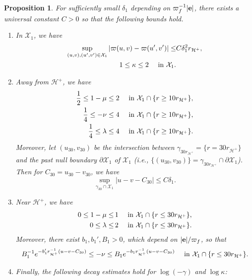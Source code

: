 \documentclass[10pt, reqno]{amsart}
\newtheorem{proposition}[theorem]{Proposition}
\theoremstyle{definition}
\theoremstyle{remark}
\theoremstyle{conjecture}
\numberwithin{equation}{section}
\newcommand{\abs}[1]{\vert#1\vert}
\newcommand{\set}[1]{\{#1\}}
\newcommand{\rd}{\partial}
\newcommand{\0}{\emptyset}
\newcommand{\gmm}{\gamma}
\newcommand{\dlt}{\delta}
\newcommand{\kpp}{\kappa}
\newcommand{\lmb}{\lambda}
\newcommand{\bfe}{{\bf e}}
\newcommand{\calH}{\mathcal H}
\newcommand{\calX}{\mathcal X}
\newcommand{\dur}{\nu}
\newcommand{\dvr}{\lmb}
\newcommand{\EH}{\calH^{+}}
\newcommand{\e}{\bfe}							%
\begin{document}
\begin{proposition}
For sufficiently small $\dlt_{1}$ depending on $\varpi_{f}^{-1} \abs{\e}$, there exists a universal constant $C > 0$ so that the following bounds hold.
\begin{enumerate}
\item In $\calX_{1}$, we have
\begin{align} 
	\sup_{(u, v), (u', v') \in \calX_{1}} \abs{\varpi(u, v) - \varpi(u', v')} 
	\leq & C \dlt_{1}^{2} r_{\EH},	\label{eq:bg-uv:m-bnd} \\
	1 \leq \kpp \leq 2 \quad \hbox{ in } \calX_{1}. \label{eq:bg-uv:kpp-bnd} 
\end{align}
\item Away from $\EH$, we have
\begin{align} 
	\frac{1}{2} \leq 1 - \mu \leq 2  \quad \hbox{ in } \calX_{1} \cap \set{r \geq 10 r_{\EH}} , 	\label{eq:bg-uv:mu-large-r} \\
	\frac{1}{4} \leq -\dur \leq 4  \quad \hbox{ in } \calX_{1} \cap \set{r \geq 10 r_{\EH}},	\label{eq:bg-uv:dur-large-r} \\
	\frac{1}{4} \leq \dvr \leq 4  \quad \hbox{ in } \calX_{1} \cap \set{r \geq 10 r_{\EH}}. 	\label{eq:bg-uv:dvr-large-r}
\end{align}
Moreover, let $(u_{30}, v_{30})$ be the intersection between $\gmm_{30 r_{\EH}} = \set{r = 30 r_{\EH}}$ and the past null boundary $\rd \calX_{1}$ of $\calX_{1}$ (i.e., $\set{(u_{30}, v_{30})} = \gmm_{30 r_{\EH}} \cap \rd \calX_{1}$). Then for $C_{30} = u_{30} - v_{30}$, we have
\begin{equation} \label{eq:bg-uv:u-v}
	\sup_{\gmm_{30} \cap \calX_{1}} \abs{u - v - C_{30}} \leq C \dlt_{1}.
\end{equation}

\item Near $\EH$, we have
\begin{align} 
	0 \leq 1 - \mu \leq &\, 1 \quad \hbox{ in } \calX_{1} \cap \set{r \leq 30 r_{\EH}}, \label{eq:bg-uv:mu-small-r} \\
	0 \leq \dvr \leq & \,2  \quad \hbox{ in } \calX_{1} \cap \set{r \leq 30 r_{\EH}}.	\label{eq:bg-uv:dvr-small-r}
\end{align}
Moreover, there exist $b_{1}, b_{1}', B_{1} > 0$, which depend on $|\e| / \varpi_{f}$, so that
\begin{equation} \label{eq:bg-uv:dur-small-r}
	B_{1}^{-1} e^{- b'_{1} r_{\EH}^{-1} (u - v - C_{30})} \leq -\dur \leq B_{1} e^{- b_{1} r_{\EH}^{-1} (u - v - C_{30})}  \quad \hbox{ in } \calX_{1} \cap \set{r \leq 30 r_{\EH}}.
\end{equation}
\item Finally, the following decay estimates hold for $\log (-\gmm)$ and $\log \kpp$:


\end{enumerate}
\end{proposition}
\end{document}
